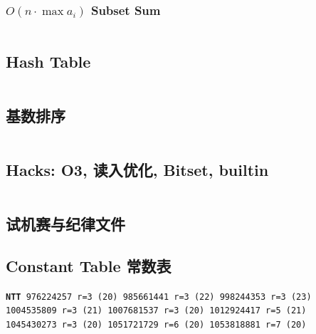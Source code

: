 \documentclass[titlepage, a4paper]{article}
\begin{document}
\begin{multicols}{2}
\begin{spacing}{0.6}
				\subsubsection{$O(n \cdot \max a_i)$ Subset Sum}
					\inputminted{cpp}{src/yzh/Subset Sum.cpp}

				\newpage
				\subsection{Hash Table}
					\inputminted[highlightlines={4,15,17,18}]{cpp}{src/DataStructure/hashmap.cpp}
				\subsection{基数排序}
					\inputminted{cpp}{src/Miscellany/RadixSort.cpp}
				\subsection{Hacks: O3, 读入优化, Bitset, builtin}
					\inputminted{cpp}{src/Miscellany/hack.cpp}
				\subsection{试机赛与纪律文件}
				\begin{spacing}{0.3}
					
				\end{spacing}
				\subsection{Constant Table 常数表}
				\label{randomprimes}
				\begin{small}
					\setlength{\parindent}{0em}\setlength{\parskip}{0em}\renewcommand{\baselinestretch}{.8}
					\texttt{}
					\texttt{\textbf{NTT} 976224257 r=3 (20)
					985661441 r=3 (22)
					998244353 r=3 (23)\\
					1004535809 r=3 (21)
					1007681537 r=3 (20)
					1012924417 r=5 (21)\\
					1045430273 r=3 (20)
					1051721729 r=6 (20)
					1053818881 r=7 (20)				
					}
				\end{small}
				

\end{spacing}
\end{multicols}
\end{document}
